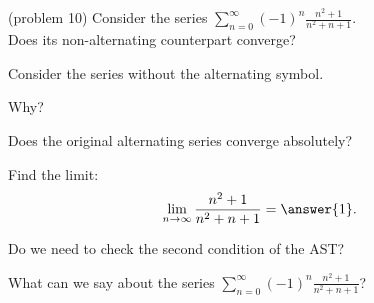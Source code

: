 \documentclass[handout]{ximera}
\begin{document}
\begin{problem}(problem 10)
Consider the series $\displaystyle{\sum_{n=0}^\infty (-1)^n \frac{n^2 + 1}{n^2 + n + 1}}$.\\
Does its non-alternating counterpart converge?
\begin{hint} 
Consider the series without the alternating symbol.
\end{hint}
\begin{multipleChoice}
\end{multipleChoice}

Why?
\begin{multipleChoice}
\end{multipleChoice}




Does the original alternating series converge absolutely?
\begin{multipleChoice}
\end{multipleChoice}



Find the limit:
\[
\lim_{n\to\infty} \frac{n^2 + 1}{n^2 + n + 1} = \answer{1}.
\]

Do we need to check the second condition of the AST?
\begin{multipleChoice}
\end{multipleChoice}


What can we say about the series $\displaystyle{\sum_{n=0}^\infty (-1)^n \frac{n^2 + 1}{n^2 + n + 1}}$?
\begin{multipleChoice}
\end{multipleChoice}

\end{problem}
\end{document}
